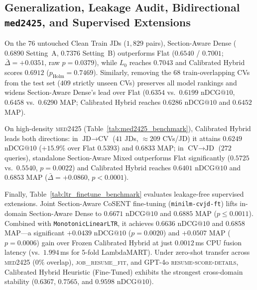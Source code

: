 

\subsection{Generalization, Leakage Audit, Bidirectional \texttt{med2425}, and Supervised Extensions}
On the $76$ untouched Clean Train JDs ($1{,}829$ pairs), Section-Aware Dense ($0.6890$ Setting~A, $0.7376$ Setting~B) outperforms Flat ($0.6540$ / $0.7001$; $\bar{\Delta}=+0.0351$, raw $p=0.0379$), while $L_0$ reaches $0.7043$ and Calibrated Hybrid scores $0.6912$ ($p_{\text{Holm}}=0.7469$). Similarly, removing the $68$ train-overlapping CVs from the test set ($409$ strictly unseen CVs) preserves all model rankings and widens Section-Aware Dense's lead over Flat ($0.6354$ vs.\ $0.6199$ $\text{nDCG}@10$, $0.6458$ vs.\ $0.6290$ $\text{MAP}$; Calibrated Hybrid reaches $0.6286$ $\text{nDCG}@10$ and $0.6452$ $\text{MAP}$).



On high-density \textsc{med2425} (Table~\ref{tab:med2425_benchmark}), Calibrated Hybrid leads both directions: in $\text{JD}\rightarrow\text{CV}$ ($41$ JDs, $\approx 209$ CVs/JD) it attains $\mathbf{0.6249}$ $\text{nDCG}@10$ ($+15.9\%$ over Flat $0.5393$) and $\mathbf{0.6833}$ $\text{MAP}$; in $\text{CV}\rightarrow\text{JD}$ ($272$ queries), standalone Section-Aware Mixed outperforms Flat significantly ($0.5725$ vs.\ $0.5540$, $p=0.0022$) and Calibrated Hybrid reaches $\mathbf{0.6401}$ $\text{nDCG}@10$ and $\mathbf{0.6853}$ $\text{MAP}$ ($\bar{\Delta}=+0.0860$, $p<0.0001$).

Finally, Table~\ref{tab:ltr_finetune_benchmark} evaluates leakage-free supervised extensions. Joint Section-Aware CoSENT fine-tuning (\texttt{minilm-cvjd-ft}) lifts in-domain Section-Aware Dense to $\mathbf{0.6671}$ $\text{nDCG}@10$ and $\mathbf{0.6885}$ $\text{MAP}$ ($p\le 0.0011$). Combined with \texttt{MonotonicLinearLTR}, it achieves $0.6636$ $\text{nDCG}@10$ and $0.6858$ $\text{MAP}$---a significant $+0.0439$ $\text{nDCG}@10$ ($p=0.0020$) and $+0.0507$ $\text{MAP}$ ($p=0.0006$) gain over Frozen Calibrated Hybrid at just $0.0012$\,ms CPU fusion latency (vs.\ $1.994$\,ms for 5-fold LambdaMART). Under zero-shot transfer across \textsc{med2425} ($0\%$ overlap), \textsc{job\_resume\_fit}, and GPT-4o \textsc{resume-score-details}, Calibrated Hybrid Heuristic (Fine-Tuned) exhibits the strongest cross-domain stability ($0.6367$, $0.7565$, and $0.9598$ $\text{nDCG}@10$).


